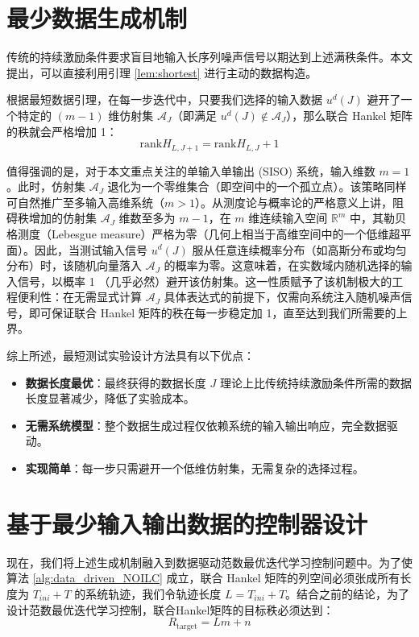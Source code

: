 \section{最少数据生成机制}

传统的持续激励条件要求盲目地输入长序列噪声信号以期达到上述满秩条件。本文提出，可以直接利用引理 \ref{lem:shortest} 进行主动的数据构造。

根据最短数据引理，在每一步迭代中，只要我们选择的输入数据 $u^d(J)$ 避开了一个特定的 $(m-1)$ 维仿射集 $\mathcal{A}_J$（即满足 $u^d(J) \notin \mathcal{A}_J$），那么联合 Hankel 矩阵的秩就会严格增加 1：
\begin{equation}
	\text{rank} H_{L, J+1} = \text{rank} H_{L, J} + 1
	\label{eq:rank_strict_increase}
\end{equation}

值得强调的是，对于本文重点关注的单输入单输出 (SISO) 系统，输入维数 $m=1$。此时，仿射集 $\mathcal{A}_J$ 退化为一个零维集合（即空间中的一个孤立点）。该策略同样可自然推广至多输入高维系统（$m>1$）。从测度论与概率论的严格意义上讲，阻碍秩增加的仿射集 $\mathcal{A}_J$ 维数至多为 $m-1$，在 $m$ 维连续输入空间 $\mathbb{R}^m$ 中，其勒贝格测度（Lebesgue measure）严格为零（几何上相当于高维空间中的一个低维超平面）。因此，当测试输入信号 $u^d(J)$ 服从任意连续概率分布（如高斯分布或均匀分布）时，该随机向量落入 $\mathcal{A}_J$ 的概率为零。这意味着，在实数域内随机选择的输入信号，以概率 1 （几乎必然）避开该仿射集。这一性质赋予了该机制极大的工程便利性：在无需显式计算 $\mathcal{A}_J$ 具体表达式的前提下，仅需向系统注入随机噪声信号，即可保证联合 Hankel 矩阵的秩在每一步稳定加 1，直至达到我们所需要的上界。

综上所述，最短测试实验设计方法具有以下优点：
\begin{itemize}
	\item \textbf{数据长度最优}：最终获得的数据长度 \(J\) 理论上比传统持续激励条件所需的数据长度显著减少，降低了实验成本。
	\item \textbf{无需系统模型}：整个数据生成过程仅依赖系统的输入输出响应，完全数据驱动。
	\item \textbf{实现简单}：每一步只需避开一个低维仿射集，无需复杂的选择过程。
\end{itemize}

\section{基于最少输入输出数据的控制器设计}

现在，我们将上述生成机制融入到数据驱动范数最优迭代学习控制问题中。为了使算法 \ref{alg:data_driven_NOILC} 成立，联合 Hankel 矩阵的列空间必须张成所有长度为 $T_{ini}+T$ 的系统轨迹，我们令轨迹长度 $L = T_{ini}+T$。结合之前的结论，为了设计范数最优迭代学习控制，联合Hankel矩阵的目标秩必须达到：
\begin{equation}
	R_{\text{target}} = Lm + n
	\label{eq:noilc_target_rank}
\end{equation}

